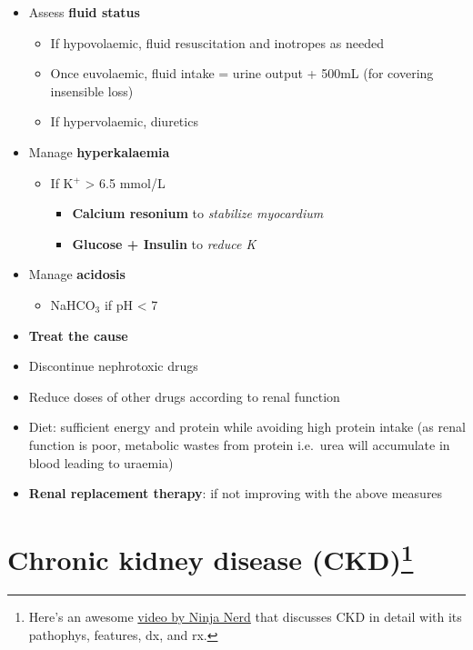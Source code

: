\documentclass[
  12pt,
]{memoir}
\providecommand{\tightlist}{%
  \setlength{\itemsep}{0pt}\setlength{\parskip}{0pt}}
\begin{document}
\begin{itemize}
\tightlist
\item
  Assess \textbf{fluid status}

  \begin{itemize}
  \tightlist
  \item
    If hypovolaemic, fluid resuscitation and inotropes as needed
  \item
    Once euvolaemic, fluid intake = urine output + 500mL (for covering
    insensible loss)
  \item
    If hypervolaemic, diuretics
  \end{itemize}
\item
  Manage \textbf{hyperkalaemia}

  \begin{itemize}
  \tightlist
  \item
    If K\(^+\) \textgreater{} 6.5 mmol/L

    \begin{itemize}
    \tightlist
    \item
      \textbf{Calcium resonium} to \emph{stabilize myocardium}
    \item
      \textbf{Glucose + Insulin} to \emph{reduce K}
    \end{itemize}
  \end{itemize}
\item
  Manage \textbf{acidosis}

  \begin{itemize}
  \tightlist
  \item
    NaHCO\(_3\) if pH \textless{} 7
  \end{itemize}
\item
  \textbf{Treat the cause}
\item
  Discontinue nephrotoxic drugs
\item
  Reduce doses of other drugs according to renal function
\item
  Diet: sufficient energy and protein while avoiding high protein intake
  (as renal function is poor, metabolic wastes from protein i.e.~urea
  will accumulate in blood leading to uraemia)
\item
  \textbf{Renal replacement therapy}: if not improving with the above
  measures
\end{itemize}

\pagebreak

\section [Chronic kidney disease (CKD)]
{Chronic kidney disease (CKD)\footnote{
Here's an awesome
 \href{https://www.youtube.com/watch?v=iyMw-b3Ypzw&list=TLPQMTQwNzIwMjJ11biDo7N03Q&index=15}
 {video by Ninja Nerd}
 that discusses CKD in detail with its
 pathophys, features, dx, and rx.}}
\end{document}
